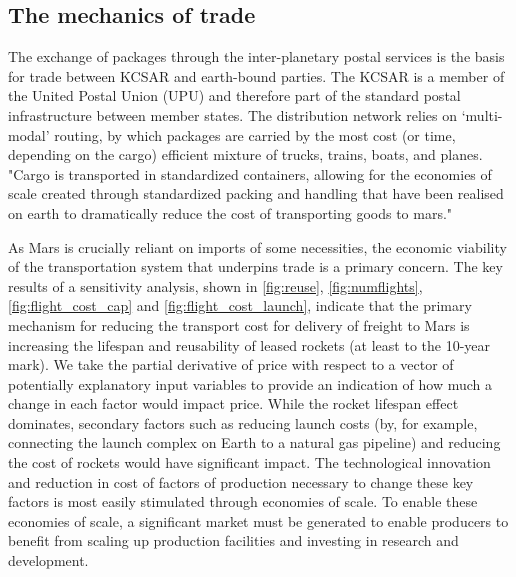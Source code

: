 \documentclass[fleqn,10pt]{Stylesheet} %
\begin{document}
\subsection{The mechanics of trade}
The exchange of packages through the inter-planetary postal services is the basis for trade between KCSAR and earth-bound parties. The KCSAR is a member of the United Postal Union (UPU) and therefore part of the standard postal infrastructure between member states. The distribution network relies on ‘multi-modal’ routing, by which packages are carried by the most cost (or time, depending on the cargo) efficient mixture of trucks, trains, boats, and planes. "Cargo is transported in standardized containers, allowing for the economies of scale created through standardized packing and handling that have been realised on earth to dramatically reduce the cost of transporting goods to mars." \cite{Levinson}

As Mars is crucially reliant on imports of some necessities, the economic viability of the transportation system that underpins trade is a primary concern. The key results of a sensitivity analysis, shown in \ref{fig:reuse}, \ref{fig:numflights}, \ref{fig:flight_cost_cap} and \ref{fig:flight_cost_launch}, indicate that the primary mechanism for reducing the transport cost for delivery of freight to Mars is increasing the lifespan and reusability of leased rockets (at least to the 10-year mark). We take the partial derivative of price with respect to a vector of potentially explanatory input variables to provide an indication of how much a change in each factor would impact price. While the rocket lifespan effect dominates, secondary factors such as reducing launch costs (by, for example, connecting the launch complex on Earth to a natural gas pipeline) and reducing the cost of rockets would have significant impact. The technological innovation and reduction in cost of factors of production necessary to change these key factors is most easily stimulated through economies of scale. To enable these economies of scale, a significant market must be generated to enable producers to benefit from scaling up production facilities and investing in research and development.
\end{document}
